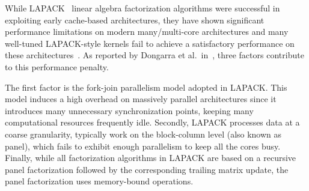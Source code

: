 While LAPACK~\cite{anderson1999lapack} linear algebra factorization
algorithms were successful in exploiting early cache-based
architectures, they have shown significant performance
limitations on modern many/multi-core architectures and many
well-tuned LAPACK-style kernels
fail to achieve a satisfactory performance on these
architectures~\cite{agullo2009comparative}.
As reported by Dongarra et al\@.~in~\cite{dongarra2011achieving},
three factors contribute to this
performance penalty.

The first factor is the fork-join parallelism
model adopted in LAPACK. This model induces a high overhead on
massively parallel architectures since it introduces many unnecessary
synchronization points, keeping many computational resources frequently
idle.
Secondly, LAPACK processes data at a coarse granularity,
typically work on the block-column level (also known as panel),
which fails to exhibit enough parallelism to
keep all the cores busy.
Finally, while all factorization algorithms in LAPACK are based on
a recursive panel factorization followed by the corresponding trailing
matrix update, the panel factorization uses memory-bound operations.


